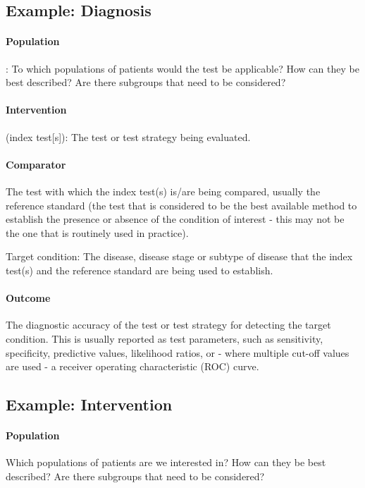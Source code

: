 \subsection*{Example: Diagnosis}
\paragraph{Population}: To which populations of patients would the test be applicable? How can they be best described? Are there subgroups that need to be considered?

\paragraph{Intervention} (index test[s]): The test or test strategy being evaluated.

\paragraph{Comparator} The test with which the index test(s) is/are being compared, usually the reference standard (the test that is considered to be the best available method to establish the presence or absence of the condition of interest - this may not be the one that is routinely used in practice).

Target condition: The disease, disease stage or subtype of disease that the index test(s) and the reference standard are being used to establish.

\paragraph{Outcome} The diagnostic accuracy of the test or test strategy for detecting the target condition. This is usually reported as test parameters, such as sensitivity, specificity, predictive values, likelihood ratios, or - where multiple cut-off values are used - a receiver operating characteristic (ROC) curve.

\subsection*{Example: Intervention}

\paragraph{Population} Which populations of patients are we interested in? How can they be best described? Are there subgroups that need to be considered?

